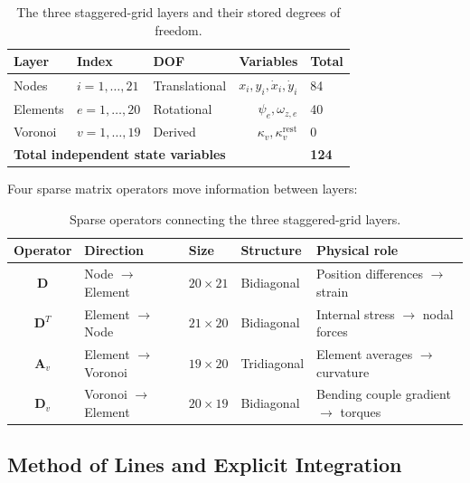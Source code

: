 \documentclass[11pt]{article}
\begin{document}
\begin{table}[H]
  \centering
  \small
  \renewcommand{\arraystretch}{1.3}
  \caption{The three staggered-grid layers and their stored degrees of freedom.}
  \label{tab:grid-layers}
  \begin{tabular}{lllrl}
    \toprule
    Layer & Index & DOF & Variables & Total \\
    \midrule
    Nodes    & $i = 1, \ldots, 21$ & Translational
      & $x_i, y_i, \dot{x}_i, \dot{y}_i$ & 84 \\
    Elements & $e = 1, \ldots, 20$ & Rotational
      & $\psi_e, \omega_{z,e}$ & 40 \\
    Voronoi  & $v = 1, \ldots, 19$ & Derived
      & $\kappa_v, \kappa_v^{\text{rest}}$ & 0 \\
    \midrule
    \multicolumn{4}{l}{\textbf{Total independent state variables}} & \textbf{124} \\
    \bottomrule
  \end{tabular}
\end{table}

Four sparse matrix operators move information between layers:

\begin{table}[H]
  \centering
  \small
  \renewcommand{\arraystretch}{1.2}
  \caption{Sparse operators connecting the three staggered-grid layers.}
  \label{tab:grid-operators}
  \begin{tabular}{cllll}
    \toprule
    Operator & Direction & Size & Structure & Physical role \\
    \midrule
    $\mathbf{D}$ & Node $\to$ Element & $20 \times 21$ & Bidiagonal & Position differences $\to$ strain \\
    $\mathbf{D}^T$ & Element $\to$ Node & $21 \times 20$ & Bidiagonal & Internal stress $\to$ nodal forces \\
    $\mathbf{A}_v$ & Element $\to$ Voronoi & $19 \times 20$ & Tridiagonal & Element averages $\to$ curvature \\
    $\mathbf{D}_v$ & Voronoi $\to$ Element & $20 \times 19$ & Bidiagonal & Bending couple gradient $\to$ torques \\
    \bottomrule
  \end{tabular}
\end{table}

\subsection{Method of Lines and Explicit Integration}
\label{app:physics:mol}
\end{document}

